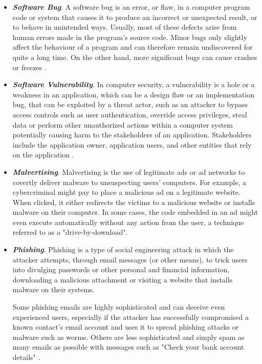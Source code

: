 \documentclass[pdfa%
,cucitura%
]{toptesi}
\begin{document}
\begin{itemize}
	\item \textbf{\textit{Software Bug}}. A software bug is an error, or flaw, in a computer program code or system that causes it to produce an incorrect or unexpected result, or to behave in unintended ways. Usually, most of these defects arise from human errors made in the program's source code. Minor bugs only slightly affect the behaviour of a program and can therefore remain undiscovered for quite a long time. On the other hand, more significant bugs can cause crashes or freezes \cite{DuPaulCMT}.
	
	\item \textbf{\textit{Software Vulnerability}}. In computer security, a vulnerability is a hole or a weakness in an application, which can be a design flaw or an implementation bug, that can be exploited by a threat actor, such as an attacker to bypass access controls such as user authentication, override access privileges, steal data or perform other unauthorized actions within a computer system potentially causing harm to the stakeholders of an application. Stakeholders include the application owner, application users, and other entities that rely on the application \cite{OWASPV}.
	
	\item \textbf{\textit{Malvertising}}. Malvertising is the use of legitimate ads or ad networks to covertly deliver malware to unsuspecting users' computers. For example, a cybercriminal might pay to place a malicious ad on a legitimate website. When clicked, it either redirects the victims to a malicious website or installs malware on their computer. In some cases, the code embedded in an ad might even execute automatically without any action from the user, a technique referred to as a "drive-by-download".
	
	\item \textbf{\textit{Phishing}}. Phishing is a type of social engineering attack in which the attacker attempts, through email messages (or other means), to trick users into divulging passwords or other personal and financial information, downloading a malicious attachment or visiting a website that installs malware on their systems.
		
	Some phishing emails are highly sophisticated and can deceive even experienced users, especially if the attacker has successfully compromised a known contact's email account and uses it to spread phishing attacks or malware such as worms. Others are less sophisticated and simply spam as many emails as possible with messages such as "Check your bank account details" \cite{ComtactWDYM}.


\end{itemize}
\end{document}
